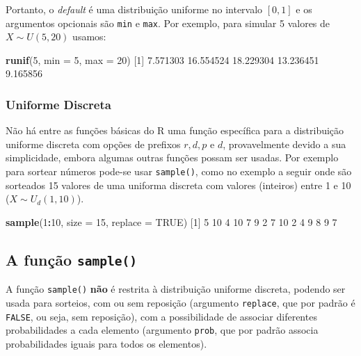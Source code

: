 \documentclass[10pt,a4paper]{book}
\newenvironment{Shaded}{\begin{snugshade}}{\end{snugshade}}
\newcommand{\KeywordTok}[1]{\textcolor[rgb]{0.13,0.29,0.53}{\textbf{#1}}}
\newcommand{\DataTypeTok}[1]{\textcolor[rgb]{0.13,0.29,0.53}{#1}}
\newcommand{\DecValTok}[1]{\textcolor[rgb]{0.00,0.00,0.81}{#1}}
\newcommand{\FloatTok}[1]{\textcolor[rgb]{0.00,0.00,0.81}{#1}}
\newcommand{\OtherTok}[1]{\textcolor[rgb]{0.56,0.35,0.01}{#1}}
\newcommand{\OperatorTok}[1]{\textcolor[rgb]{0.81,0.36,0.00}{\textbf{#1}}}
\newcommand{\NormalTok}[1]{#1}
\begin{document}
Portanto, o \emph{default} é uma distribuição uniforme no intervalo
\([0,1]\) e os argumentos opcionais são \texttt{min} e \texttt{max}. Por
exemplo, para simular 5 valores de \(X \sim U(5, 20)\) usamos:

\begin{Shaded}
\begin{Highlighting}[]
\KeywordTok{runif}\NormalTok{(}\DecValTok{5}\NormalTok{, }\DataTypeTok{min =} \DecValTok{5}\NormalTok{, }\DataTypeTok{max =} \DecValTok{20}\NormalTok{)}
\NormalTok{[}\DecValTok{1}\NormalTok{]  }\FloatTok{7.571303} \FloatTok{16.554524} \FloatTok{18.229304} \FloatTok{13.236451}  \FloatTok{9.165856}
\end{Highlighting}
\end{Shaded}

\subsubsection{Uniforme Discreta}\label{uniforme-discreta}

Não há entre as funções básicas do R uma função específica para a
distribuição uniforme discreta com opções de prefixos \(r,d,p\) e \(d\),
provavelmente devido a sua simplicidade, embora algumas outras funções
possam ser usadas. Por exemplo para sortear números pode-se usar
\texttt{sample()}, como no exemplo a seguir onde são sorteados 15
valores de uma uniforma discreta com valores (inteiros) entre 1 e 10
(\(X \sim U_d(1,10)\)).

\begin{Shaded}
\begin{Highlighting}[]
\KeywordTok{sample}\NormalTok{(}\DecValTok{1}\OperatorTok{:}\DecValTok{10}\NormalTok{, }\DataTypeTok{size =} \DecValTok{15}\NormalTok{, }\DataTypeTok{replace =} \OtherTok{TRUE}\NormalTok{)}
\NormalTok{ [}\DecValTok{1}\NormalTok{]  }\DecValTok{5} \DecValTok{10}  \DecValTok{4} \DecValTok{10}  \DecValTok{7}  \DecValTok{9}  \DecValTok{2}  \DecValTok{7} \DecValTok{10}  \DecValTok{2}  \DecValTok{4}  \DecValTok{9}  \DecValTok{8}  \DecValTok{9}  \DecValTok{7}
\end{Highlighting}
\end{Shaded}

\subsection{\texorpdfstring{A função
\texttt{sample()}}{A função sample()}}\label{a-funcao-sample}

A função \texttt{sample()} \textbf{não} é restrita à distribuição
uniforme discreta, podendo ser usada para sorteios, com ou sem reposição
(argumento \texttt{replace}, que por padrão é \texttt{FALSE}, ou seja,
sem reposição), com a possibilidade de associar diferentes
probabilidades a cada elemento (argumento \texttt{prob}, que por padrão
associa probabilidades iguais para todos os elementos).
\end{document}
